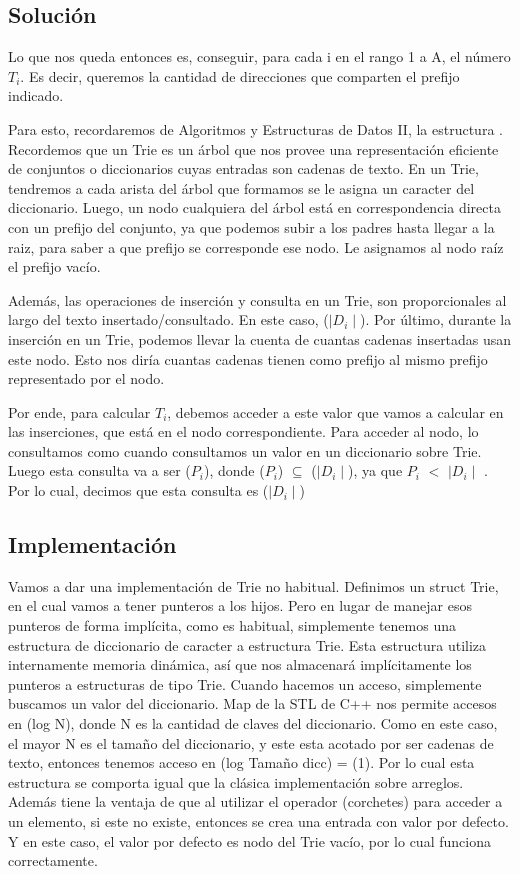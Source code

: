 \subsection{Solución}
\par{Lo que nos queda entonces es, conseguir, para cada i en el rango 1 a A, el número $T_i$.
Es decir, queremos la cantidad de direcciones que comparten el prefijo indicado.}
\par{Para esto, recordaremos de Algoritmos y Estructuras de Datos II, la estructura .
Recordemos que un Trie es un árbol que nos provee una representación eficiente de conjuntos o diccionarios cuyas entradas son cadenas de texto. En un Trie, tendremos a cada arista del árbol que formamos se le asigna un caracter del diccionario. Luego, un nodo cualquiera del árbol está en correspondencia directa con un prefijo del conjunto, ya que podemos subir a los padres hasta llegar a la raiz, para saber a que prefijo se corresponde ese nodo. Le asignamos al nodo raíz el prefijo vacío.}
\par{Además, las operaciones de inserción y consulta en un Trie, son proporcionales al largo del texto
insertado/consultado. En este caso, \bigo($\mid D_i \mid$). Por último, durante la inserción en un Trie, podemos llevar la cuenta de cuantas cadenas insertadas usan este nodo. Esto nos diría cuantas cadenas
tienen como prefijo al mismo prefijo representado por el nodo.}
\par{Por ende, para calcular $T_i$, debemos acceder a este valor que vamos a calcular en las inserciones, que está en el nodo correspondiente. Para acceder al nodo, lo consultamos como cuando consultamos un valor en un diccionario sobre Trie. Luego esta consulta va a ser \bigo($P_i$), donde
\bigo($P_i$) $\subseteq$ \bigo($\mid D_i \mid$), ya que $P_i$ $<$ $\mid D_i \mid$ . Por lo cual, decimos que esta consulta es \bigo($\mid D_i \mid$)}

\subsection{Implementación}
Vamos a dar una implementación de Trie no habitual. Definimos un struct Trie, en el cual
vamos a tener punteros a los hijos. Pero en lugar de manejar esos punteros de forma implícita, 
como es habitual, simplemente tenemos una estructura de diccionario de caracter a estructura Trie.
Esta estructura utiliza internamente memoria dinámica, así que nos almacenará implícitamente 
los punteros a estructuras de tipo Trie. Cuando hacemos un acceso, simplemente buscamos un valor
del diccionario. Map de la STL de C++ nos permite accesos en \bigo(log N), donde N es la cantidad de claves del diccionario. Como en este caso, el mayor N es el tamaño del diccionario, y este esta
acotado por ser cadenas de texto, entonces tenemos acceso en \bigo(log Tamaño dicc) = \bigo(1).
Por lo cual esta estructura se comporta igual que la clásica implementación sobre arreglos.
Además tiene la ventaja de que al utilizar el operador \quotes{[]}(corchetes) para acceder a un elemento, si este no existe, entonces se crea una entrada con valor por defecto. Y en este caso, 
el valor por defecto es nodo del Trie vacío, por lo cual funciona correctamente.


